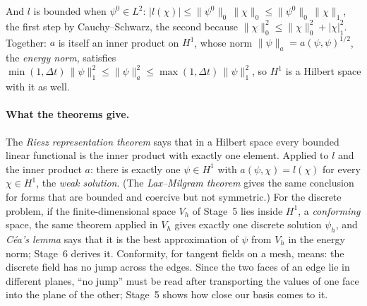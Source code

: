 And $l$ is bounded when $\psi^0 \in L^2$: $|l(\chi)| \le \|\psi^0\|_0\, \|\chi\|_0 \le \|\psi^0\|_0\, \|\chi\|_1$, the first step by Cauchy--Schwarz, the second because $\|\chi\|_0^2 \le \|\chi\|_0^2 + |\chi|_1^2$. Together: $a$ is itself an inner product on $H^1$, whose norm $\|\psi\|_a = a(\psi, \psi)^{1/2}$, the \emph{energy norm}, satisfies $\min(1, \Delta t)\,\|\psi\|_1^2 \le \|\psi\|_a^2 \le \max(1, \Delta t)\,\|\psi\|_1^2$, so $H^1$ is a Hilbert space with it as well.

\paragraph{What the theorems give.} The \emph{Riesz representation theorem} says that in a Hilbert space every bounded linear functional is the inner product with exactly one element. Applied to $l$ and the inner product $a$: there is exactly one $\psi \in H^1$ with $a(\psi, \chi) = l(\chi)$ for every $\chi \in H^1$, the \emph{weak solution}. (The \emph{Lax--Milgram theorem} gives the same conclusion for forms that are bounded and coercive but not symmetric.) For the discrete problem, if the finite-dimensional space $V_h$ of Stage~5 lies inside $H^1$, a \emph{conforming} space, the same theorem applied in $V_h$ gives exactly one discrete solution $\psi_h$, and \emph{C\'ea's lemma} says that it is the best approximation of $\psi$ from $V_h$ in the energy norm; Stage~6 derives it. Conformity, for tangent fields on a mesh, means: the discrete field has no jump across the edges. Since the two faces of an edge lie in different planes, ``no jump'' must be read after transporting the values of one face into the plane of the other; Stage~5 shows how close our basis comes to it.

